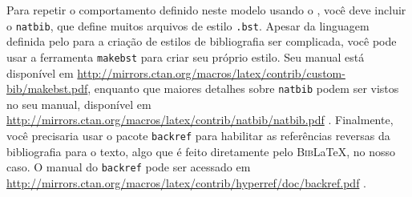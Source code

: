 Para repetir o comportamento definido neste modelo usando o , você deve incluir o \texttt{natbib}, que define muitos arquivos de estilo \texttt{.bst}. Apesar da linguagem definida pelo  para a criação de estilos de bibliografia ser complicada, você pode usar a ferramenta \texttt{makebst} para criar seu próprio estilo. Seu manual está disponível em  \url{http://mirrors.ctan.org/macros/latex/contrib/custom-bib/makebst.pdf}, enquanto que maiores detalhes sobre \texttt{natbib} podem ser vistos no seu manual, disponível em \url{http://mirrors.ctan.org/macros/latex/contrib/natbib/natbib.pdf} \cite{natbib}. Finalmente, você precisaria usar o pacote \texttt{backref} para habilitar as referências reversas da bibliografia para o texto, algo que é feito diretamente pelo \textsc{Bib}\LaTeX{}, no nosso caso. O manual do \texttt{backref} pode ser acessado em  \url{http://mirrors.ctan.org/macros/latex/contrib/hyperref/doc/backref.pdf} \parencite{backref}.


